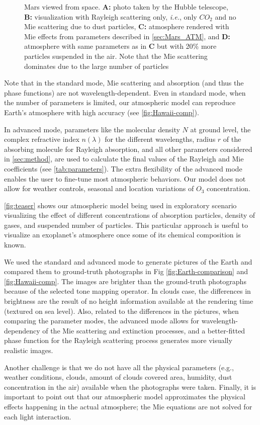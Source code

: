 \documentclass[journal]{vgtc}                %
\begin{document}
{\begin{figure}
{  \vspace*{-7mm}
  \caption{Mars viewed from space. \textbf{A:} photo taken by the Hubble telescope, \textbf{B:} visualization with Rayleigh scattering only, \textit{i.e.}, only $CO_2$ and no Mie scattering due to dust particles, \textbf{C:} atmosphere rendered with Mie effects from parameters described in \autoref{sec:Mars_ATM}, and \textbf{D:} atmosphere with same parameters as in \textbf{C} but with 20\% more particles suspended in the air. Note that the Mie scattering dominates due to the large number of particles}
 \label{fig:Mars-Ray-Mie}
 \vspace*{-2mm}
 } %
\end{figure}
%
Note that in the standard mode, Mie scattering and absorption (and thus the phase functions) are not wavelength-dependent. Even in standard mode, when the number of parameters is limited, our atmospheric model can reproduce Earth's atmosphere with high accuracy (see \autoref{fig:Hawaii-comp}). 

In advanced mode, parameters like the molecular density $N$ at ground level, the complex refractive index $n(\lambda)$ for the different wavelengths, radius $r$ of the absorbing molecule for Rayleigh absorption, and all other parameters considered in \autoref{sec:method}, are used to calculate the final values of the Rayleigh and Mie coefficients (see \autoref{tab:parameters}).
%
The extra flexibility of the advanced mode enables the user to fine-tune most atmospheric behaviors. Our model does not allow for weather controls, seasonal and location variations of $O_3$ concentration.

%
\autoref{fig:teaser} shows our atmospheric model being used in exploratory scenario visualizing the effect of different concentrations of absorption particles, density of gases, and suspended number of particles. This particular approach is useful to visualize an exoplanet's atmosphere once some of its chemical composition is known.

We used the standard and advanced mode to generate pictures of the Earth and compared them to ground-truth photographs in Fig \ref{fig:Earth-comparison} and \ref{fig:Hawaii-comp}. The images are brighter than the ground-truth photographs because of the selected tone mapping operator. In clouds case, the differences in brightness are the result of no height information available at the rendering time (textured on sea level).
Also, related to the differences in the pictures, when comparing the parameter modes, the advanced mode allows for wavelength-dependency of the Mie scattering and extinction processes, and a better-fitted phase function for the Rayleigh scattering process generates more visually realistic images. 

Another challenge is that we do not have all the physical parameters (e.g., weather conditions, clouds, amount of clouds covered area, humidity, dust concentration in the air) available when the photographs were taken.
Finally, it is important to point out that our atmospheric model approximates the physical effects happening in the actual atmosphere; the Mie equations are not solved for each light interaction. 

}
\end{document}
